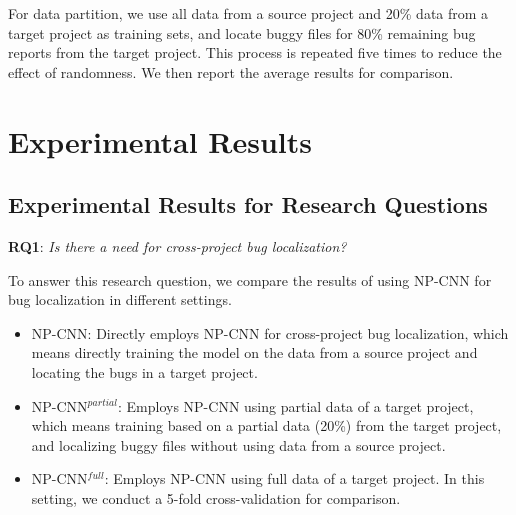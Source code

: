 
For data partition, we use all data from a source project and 20\% data from a target project as training sets, and locate buggy files for 80\% remaining bug reports from the target project. This process is repeated five times to reduce the effect of randomness. We then report the average results for comparison. 

\section{Experimental Results}

\subsection{Experimental Results for Research Questions}






\textbf{RQ1}: \textit{Is there a need for cross-project bug localization?}

To answer this research question, we compare the results of using NP-CNN for bug localization in different settings.

\begin{itemize}
  \item NP-CNN: Directly employs NP-CNN for cross-project bug localization, which means directly training the model on the data from a source project and locating the bugs in a target project.
  \item NP-CNN$^{partial}$: Employs NP-CNN using partial data of a target project, which means training based on a partial data (20\%) from the target project, and localizing buggy files without using data from a source project.
  \item NP-CNN$^{full}$: Employs NP-CNN using full data of a target project. In this setting, we conduct a 5-fold cross-validation for comparison.
\end{itemize}

